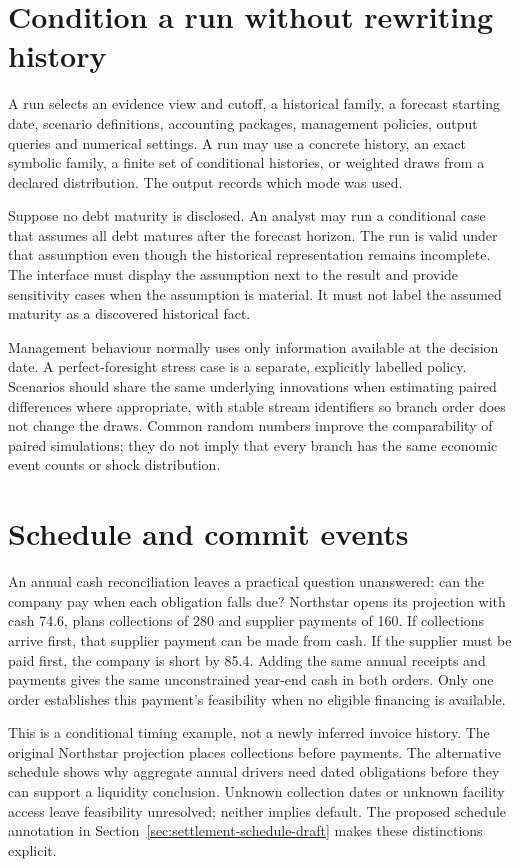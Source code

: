 \section{Condition a run without rewriting history}

A run selects an evidence view and cutoff, a historical family, a forecast
starting date, scenario definitions, accounting packages, management policies,
output queries and numerical settings. A run may use a concrete history,
an exact symbolic family, a finite set of conditional histories, or weighted
draws from a declared distribution. The output records which mode was used.

Suppose no debt maturity is disclosed. An analyst may run a conditional case
that assumes all debt matures after the forecast horizon. The run is valid
under that assumption even though the historical representation remains
incomplete. The interface must display the assumption next to the result and
provide sensitivity cases when the assumption is material. It must not label
the assumed maturity as a discovered historical fact.

Management behaviour normally uses only information available at the decision
date. A perfect-foresight stress case is a separate, explicitly labelled
policy. Scenarios should share the same underlying innovations when estimating
paired differences where appropriate, with stable stream identifiers so
branch order does not change the draws. Common random numbers improve the
comparability of paired simulations; they do not imply that every branch has
the same economic event counts or shock distribution.

\section{Schedule and commit events}

An annual cash reconciliation leaves a practical question unanswered: can the
company pay when each obligation falls due? Northstar opens its projection
with cash 74.6, plans collections of 280 and supplier payments of 160. If
collections arrive first, that supplier payment can be made from cash. If
the supplier must be paid first, the company is short by 85.4. Adding the
same annual receipts and payments gives the same unconstrained year-end cash
in both orders. Only one order establishes this payment's feasibility when no
eligible financing is available.

This is a conditional timing example, not a newly inferred invoice history.
The original Northstar projection places collections before payments. The
alternative schedule shows why aggregate annual drivers need dated obligations
before they can support a liquidity conclusion. Unknown collection dates or
unknown facility access leave feasibility unresolved; neither implies default.
The proposed schedule annotation in
Section~\ref{sec:settlement-schedule-draft} makes these distinctions explicit.

